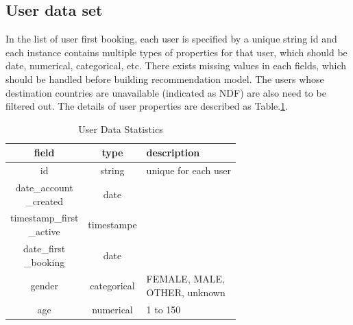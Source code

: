 \documentclass{sig-alternate-05-2015}
\begin{document}
\subsection{User data set}
In the list of user first booking, each user is specified by a unique string id and each instance contains multiple types of properties for that user, which should be date, numerical, categorical, etc. There exists missing values in each fields, which should be handled before building recommendation model. The users whose destination countries are unavailable (indicated as NDF) are also need to be filtered out. The details of user properties are described as Table.\ref{table:users}.

\begin{table}[!htb]
\caption{User Data Statistics}
\label{table:users}
\begin{tabular}{|c|c|l|} \hline
field & type & description  \\ \hline                                                                                                                              
id & string & unique for each user \\ \hline                                                                                                                     
\shortstack{date\_account\\ \_created} & date & ~ \\ \hline                                                                                                                                             
\shortstack{timestamp\_first\\ \_active}  & timestampe & ~  \\ \hline                                                                                                                                          \shortstack{date\_first\\ \_booking} & date & ~ \\ \hline                                                                                                                                             
gender & categorical & \shortstack[l]{FEMALE, MALE, \\OTHER, unknown} \\ \hline                                                                                                                 
age & numerical & 1 to 150  \\ \hline                                                                                                                      

\end{tabular}
\end{table}
\end{document}
